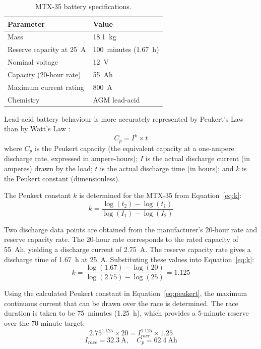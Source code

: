 \documentclass[12pt]{article}
\begin{document}
\begin{table}[htbp]
  \centering
  \caption{MTX-35 battery specifications.}
  \label{tab:mtx35}
  \begin{tabular}{ll}
    \toprule
    \textbf{Parameter} & \textbf{Value} \\
    \midrule
    Mass                       & 18.1~kg \\
    Reserve capacity at 25~A   & 100~minutes (1.67~h) \\
    Nominal voltage            & 12~V \\
    Capacity (20-hour rate)    & 55~Ah \\
    Maximum current rating     & 800~A \\
    Chemistry                  & AGM lead-acid \\
    \bottomrule
  \end{tabular}
\end{table}

Lead-acid battery behaviour is more accurately represented by Peukert's Law
than by Watt's Law \cite{peukert}:
\begin{equation}
  C_p = I^k \times t
  \label{eq:peukert}
\end{equation}
where $C_p$ is the Peukert capacity (the equivalent capacity at a
one-ampere discharge rate, expressed in ampere-hours); $I$ is the actual
discharge current (in amperes) drawn by the load; $t$ is the actual
discharge time (in hours); and $k$ is the Peukert constant (dimensionless).

The Peukert constant $k$ is determined for the MTX-35 from
Equation~\ref{eq:k}:
\begin{equation}
  k = \frac{\log(t_2) - \log(t_1)}{\log(I_1) - \log(I_2)}
  \label{eq:k}
\end{equation}

Two discharge data points are obtained from the manufacturer's 20-hour rate
and reserve capacity rate. The 20-hour rate corresponds to the rated
capacity of 55~Ah, yielding a discharge current of 2.75~A. The reserve
capacity rate gives a discharge time of 1.67~h at 25~A. Substituting these
values into Equation~\ref{eq:k}:
\[
k = \frac{\log(1.67)-\log(20)}{\log(2.75)-\log(25)} = 1.125
\]

Using the calculated Peukert constant in Equation~\ref{eq:peukert}, the
maximum continuous current that can be drawn over the race is determined.
The race duration is taken to be 75~minutes (1.25~h), which provides a
5-minute reserve over the 70-minute target:
\[
2.75^{1.125} \times 20 = I_{race}^{1.125} \times 1.25
\]
\[
I_{race} = 32.3~\text{A}, \quad C_p = 62.4~\text{Ah}
\]
\end{document}
